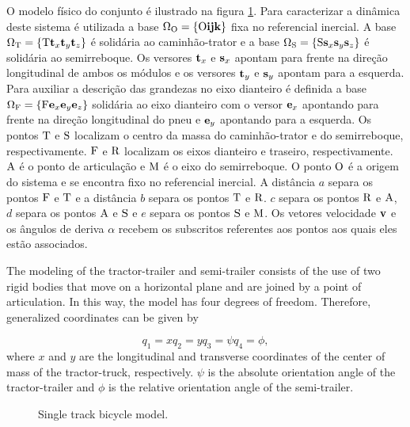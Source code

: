 \documentclass[sublist]{fei}
\begin{document}
O modelo físico do conjunto é ilustrado na figura \ref{modelSimple}. Para caracterizar a dinâmica deste sistema é utilizada a base \( \Omega_{\rm O} = \{ {\rm O} {\bf i} {\bf j} {\bf k} \}\) fixa no referencial inercial. A base \( \Omega_{\rm T} = \{ {\rm T} {\bf t}_x {\bf t}_y {\bf t}_z \}\) é solidária ao caminhão-trator e a base \( \Omega_{\rm S} = \{ {\rm S} {\bf s}_x {\bf s}_y {\bf s}_z \}\) é solidária ao semirreboque. Os versores \({\bf t}_x\) e \({\bf s}_x\) apontam para frente na direção longitudinal de ambos os módulos e os versores \({\bf t}_y\) e \({\bf s}_y\) apontam para a esquerda. Para auxiliar a descrição das grandezas no eixo dianteiro é definida a base \( \Omega_{\rm F} = \{ {\rm F} {\bf e}_x {\bf e}_y {\bf e}_z \}\) solidária ao eixo dianteiro com o versor \({\bf e}_x\) apontando para frente na direção longitudinal do pneu e \({\bf e}_y\) apontando para a esquerda. Os pontos \({\rm T}\) e \({\rm S}\) localizam o centro da massa do caminhão-trator e do semirreboque, respectivamente. \({\rm F}\) e \({\rm R}\) localizam os eixos dianteiro e traseiro, respectivamente. \({\rm A}\) é o ponto de articulação e \({\rm M}\) é o eixo do semirreboque. O ponto \({\rm O}\) é a origem do sistema e se encontra fixo no referencial inercial. A distância \(a\) separa os pontos \({\rm F}\) e \({\rm T}\) e a distância \(b\) separa os pontos \({\rm T}\) e \({\rm R}\). \(c\) separa os pontos \({\rm R}\) e \({\rm A}\), \(d\) separa os pontos \({\rm A}\) e \({\rm S}\) e \(e\) separa os pontos \({\rm S}\) e \({\rm M}\). Os vetores velocidade \({\bf v}\) e os ângulos de deriva \(\alpha\) recebem os subscritos referentes aos pontos aos quais eles estão associados.

The modeling of the tractor-trailer and semi-trailer consists of the use of two rigid bodies that move on a horizontal plane and are joined by a point of articulation. In this way, the model has four degrees of freedom. Therefore, generalized coordinates can be given by

\begin{subequations}
\begin{equation}
    q_1 = x
\end{equation}
\begin{equation}
    q_2 = y
\end{equation}
\begin{equation}
    q_3 = \psi
\end{equation}
\begin{equation}
    q_4 = \phi,
\end{equation}
\end{subequations}
where \(x \) and \(y \) are the longitudinal and transverse coordinates of the center of mass of the tractor-truck, respectively. \(\psi \) is the absolute orientation angle of the tractor-trailer and \(\phi \) is the relative orientation angle of the semi-trailer.
\begin{figure}
    \begin{center}
    \caption{Single track bicycle model.} \label{modelSimple}
    \end{center}
\end{figure}
\end{document}
